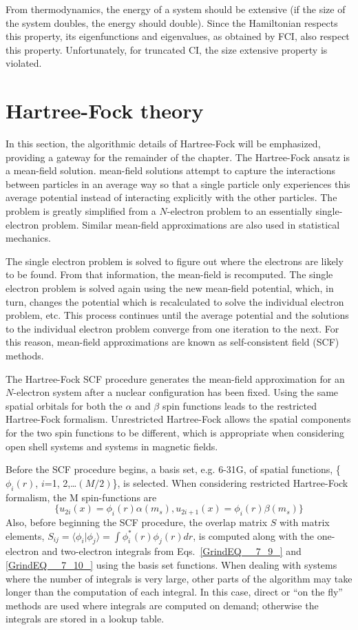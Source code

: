 \documentclass[11pt,oneside,final]{huthesis}%
\begin{document}
From thermodynamics, the energy of a system should be extensive (if the size of the system doubles, the energy should double).  Since the Hamiltonian respects this property, its eigenfunctions and eigenvalues, as obtained by FCI, also respect this property.  Unfortunately, for truncated CI, the {size extensive} property is violated. 

\section{Hartree-Fock theory}\label{HF}

In this section, the algorithmic details of Hartree-Fock will be emphasized, providing a gateway for the remainder of the chapter. The Hartree-Fock ansatz is a mean-field solution.  mean-field solutions attempt to capture the interactions between particles in an average way so that a single particle only experiences this average potential instead of interacting explicitly with the other particles. The problem is greatly simplified from a $N$-electron problem to an essentially single-electron problem. Similar mean-field approximations are also used in statistical mechanics. 

The single electron problem is solved to figure out where the electrons are likely to be found.  From that information, the mean-field is recomputed.  The single electron problem is solved again using the new mean-field potential, which, in turn, changes the  potential which is recalculated to solve the individual electron problem, etc. This process continues until the average potential and the solutions to the individual electron problem converge from one iteration to the next. For this reason, mean-field approximations are known as self-consistent field (SCF) methods.

The Hartree-Fock SCF procedure generates the mean-field approximation for an $N$-electron system after a nuclear configuration has been fixed. Using the same spatial orbitals for both the $\alpha$ and $\beta$ spin functions leads to the {restricted Hartree-Fock} formalism. {Unrestricted Hartree-Fock} allows the spatial components for the two spin functions to be different, which is appropriate when considering open shell systems and systems in magnetic fields.

Before the SCF procedure begins, a basis set, e.g. 6-31G, of spatial functions, \{$\phi _{i} (r)$, $i$=1, 2,\dots $(M/2)$\},  is selected. When considering restricted Hartree-Fock formalism, the M spin-functions are \[\{u_{2i} (x)=\phi _{i} (r)\alpha (m_{s} ), u_{2i+1} (x)=\phi _{i} (r)\beta (m_{s} )\}\]   Also, before beginning the SCF procedure, the overlap matrix $S$ with matrix elements, $S_{ij} ={\langle \phi _{i}  | \phi _{j}  \rangle}=\int\phi_i^*(r)\phi_j(r)dr$, is computed along with the one-electron and two-electron integrals from Eqs.~\eqref{GrindEQ__7_9_} and \eqref{GrindEQ__7_10_}  using the basis set functions. When dealing with systems where the number of integrals is very large, other parts of the algorithm may take longer than the computation of each integral. In this case, {direct} or ``on the fly'' methods are used where integrals are computed on demand; otherwise the integrals are stored in a lookup table.
\end{document}
